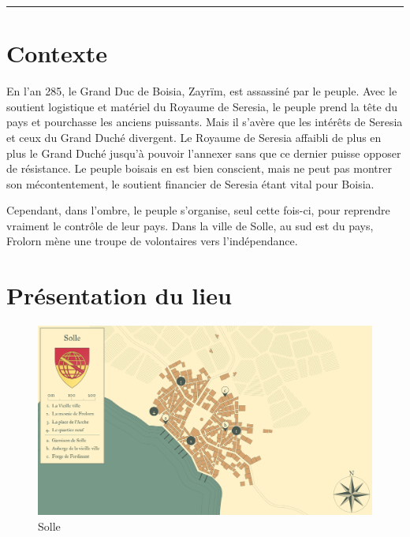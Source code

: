 \documentclass[french, a4paper, 12pt]{article}
\begin{document}
 \maketitle \vspace{3pt} \hrule \vspace{3pt}

\tableofcontents

\section{Contexte}

En l'an 285, le Grand Duc de Boisia, Zayrïm, est assassiné par le peuple. Avec le soutient logistique et matériel du Royaume de Seresia, le peuple prend la tête du pays et pourchasse les anciens puissants. Mais il s'avère que les intérêts de Seresia et ceux du Grand Duché divergent. Le Royaume de Seresia affaibli de plus en plus le Grand Duché jusqu'à pouvoir l'annexer sans que ce dernier puisse opposer de résistance. Le peuple boisais en est bien conscient, mais ne peut pas montrer son mécontentement, le soutient financier de Seresia étant vital pour Boisia.

Cependant, dans l'ombre, le peuple s'organise, seul cette fois-ci, pour reprendre vraiment le contrôle de leur pays. Dans la ville de Solle, au sud est du pays, Frolorn mène une troupe de volontaires vers l'indépendance.

\section{Présentation du lieu}

\begin{figure}[htp]
\centering
\includegraphics[width=18cm]{Cartes/Solle.png}
\caption{Solle}
\label{solle}
\end{figure}
\end{document}
